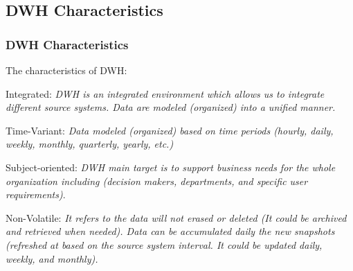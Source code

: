 \subsection{DWH Characteristics}
\begin{frame}
    \frametitle{DWH Characteristics}
    \begin{wideitemize}
        \item The characteristics of DWH:
        \begin{wideitemize}
            \item Integrated: \textit{DWH is an integrated environment which allows us to integrate different source systems. Data are modeled (organized) into a unified manner.} %

            \item Time-Variant: \textit{Data modeled (organized) based on time periods (hourly, daily, weekly, monthly, quarterly, yearly, etc.)}

            \item Subject-oriented: \textit{DWH main target is to support business needs for the whole organization including (decision makers, departments, and specific user requirements)}.

            \item Non-Volatile: \textit{It refers to the data will not erased or deleted (It could be archived and retrieved when needed). Data can be accumulated daily the new snapshots (refreshed at based on the source system interval. \faEdit \space \faArrowCircleORight \space It could be updated daily, weekly, and monthly).}
        \end{wideitemize}
    \end{wideitemize}

\end{frame}

\VideoClassification[column=2, colour=blue]

